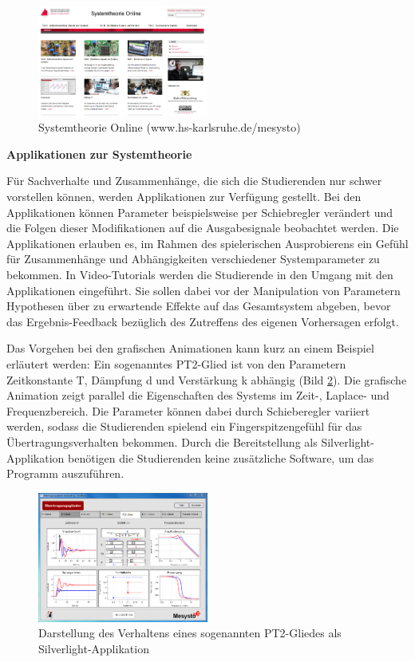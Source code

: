 \begin{figure}[H]
  \centerline{\includegraphics[width=0.5\textwidth]{Einleitung/Bilder/image1}}
  \caption{Systemtheorie Online (www.hs-karlsruhe.de/mesysto)}
  \label{fig:SYSONLINE}
\end{figure}
\bigskip

{\selectfont
\noindent\textbf{Applikationen zur Systemtheorie}} \smallskip

\noindent Für Sachverhalte und Zusammenhänge, die sich die Studierenden nur schwer vorstellen können, werden Applikationen zur Verfügung gestellt. Bei den Applikationen können Parameter beispielsweise per Schiebregler verändert und die Folgen dieser Modifikationen auf die Ausgabesignale beobachtet werden. Die Applikationen erlauben es, im Rahmen des spielerischen Ausprobierens ein Gefühl für Zusammenhänge und Abhängigkeiten verschiedener Systemparameter zu bekommen. In Video-Tutorials werden die Studierende in den Umgang mit den Applikationen eingeführt. Sie sollen dabei vor der Manipulation von Parametern Hypothesen über zu erwartende Effekte auf das Gesamtsystem abgeben, bevor das Ergebnis-Feedback bezüglich des Zutreffens des eigenen Vorhersagen erfolgt.

\clearpage
\noindent Das Vorgehen bei den grafischen Animationen kann kurz an einem Beispiel erläutert werden: Ein sogenanntes PT2-Glied ist von den Parametern Zeitkonstante T, Dämpfung d und Verstärkung k abhängig (Bild \ref{fig:PT2GLIED}). Die grafische Animation zeigt parallel die Eigenschaften des Systems im Zeit-, Laplace- und Frequenzbereich. Die Parameter können dabei durch Schieberegler variiert werden, sodass die Studierenden spielend ein Fingerspitzengefühl für das Übertragungsverhalten bekommen. Durch die Bereitstellung als Silverlight-Applikation benötigen die Studierenden keine zusätzliche Software, um das Programm auszuführen.

\begin{figure}[H]
  \centerline{\includegraphics[width=0.5\textwidth]{Einleitung/Bilder/image2}}
  \caption{Darstellung des Verhaltens eines sogenannten PT2-Gliedes als Silverlight-Applikation}
  \label{fig:PT2GLIED}
\end{figure}

